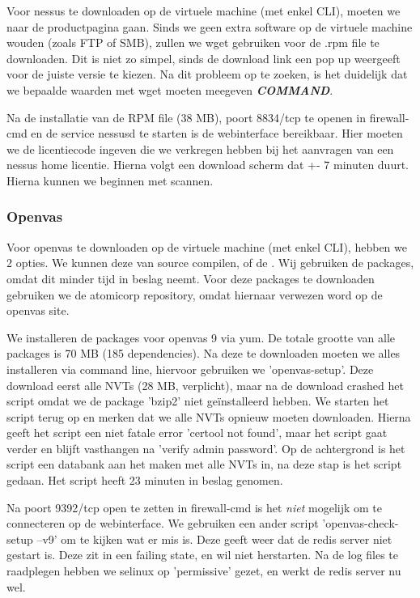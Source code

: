 Voor nessus te downloaden op de virtuele machine (met enkel CLI), moeten we naar de productpagina gaan. Sinds we geen extra software op de virtuele machine wouden (zoals FTP of SMB), zullen we wget gebruiken voor de .rpm file te downloaden. Dit is niet zo simpel, sinds de download link een pop up weergeeft voor de juiste versie te kiezen. Na dit probleem op te zoeken, is het duidelijk dat we bepaalde waarden met wget moeten meegeven \textbf{\textit{COMMAND}}.

Na de installatie van de RPM file (38 MB), poort 8834/tcp te openen in firewall-cmd en de service nessusd te starten is de webinterface bereikbaar. Hier moeten we de licentiecode ingeven die we verkregen hebben bij het aanvragen van een nessus home licentie. Hierna volgt een download scherm dat +- 7 minuten duurt. Hierna kunnen we beginnen met scannen.

\subsubsection{Openvas}

Voor openvas te downloaden op de virtuele machine (met enkel CLI), hebben we 2 opties. We kunnen deze van source compilen, of de \textcite{Openvas-installation}. Wij gebruiken de packages, omdat dit minder tijd in beslag neemt. Voor deze packages te downloaden gebruiken we de atomicorp repository, omdat hiernaar verwezen word op de openvas site.

We installeren de packages voor openvas 9 via yum. De totale grootte van alle packages is 70 MB (185 dependencies). Na deze te downloaden moeten we alles installeren via command line, hiervoor gebruiken we 'openvas-setup'. Deze download eerst alle NVTs (28 MB, verplicht), maar na de download crashed het script omdat we de package 'bzip2' niet geïnstalleerd hebben. We starten het script terug op en merken dat we alle NVTs opnieuw moeten downloaden. Hierna geeft het script een niet fatale error 'certool not found', maar het script gaat verder en blijft vasthangen na 'verify admin password'. Op de achtergrond is het script een databank aan het maken met alle NVTs in, na deze stap is het script gedaan. Het script heeft 23 minuten in beslag genomen.

Na poort 9392/tcp open te zetten in firewall-cmd is het \textit{niet} mogelijk om te connecteren op de webinterface. We gebruiken een ander script 'openvas-check-setup --v9' om te kijken wat er mis is. Deze geeft weer dat de redis server niet gestart is. Deze zit in een failing state, en wil niet herstarten. Na de log files te raadplegen hebben we selinux op 'permissive' gezet, en werkt de redis server nu wel.

